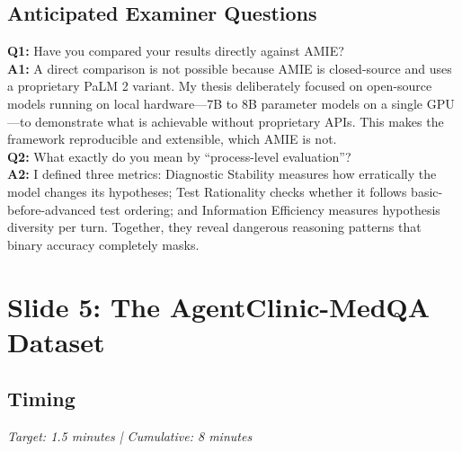 \documentclass[12pt]{article}
\begin{document}
  \subsection*{Anticipated Examiner Questions}
  \begin{qabox}
  \textbf{Q1:} Have you compared your results directly against AMIE? \\
  \textbf{A1:} A direct comparison is not possible because AMIE is closed-source and uses a proprietary PaLM 2 variant. My thesis deliberately focused on open-source models running on local hardware---7B to 8B parameter models on a single GPU---to demonstrate what is achievable without proprietary APIs. This makes the framework reproducible and extensible, which AMIE is not. \\[6pt]
  \textbf{Q2:} What exactly do you mean by ``process-level evaluation''? \\
  \textbf{A2:} I defined three metrics: Diagnostic Stability measures how erratically the model changes its hypotheses; Test Rationality checks whether it follows basic-before-advanced test ordering; and Information Efficiency measures hypothesis diversity per turn. Together, they reveal dangerous reasoning patterns that binary accuracy completely masks.
  \end{qabox}



  \section{Slide 5: The AgentClinic-MedQA Dataset}

  \subsection*{Timing}
  \textit{Target: 1.5 minutes | Cumulative: 8 minutes}
\end{document}

